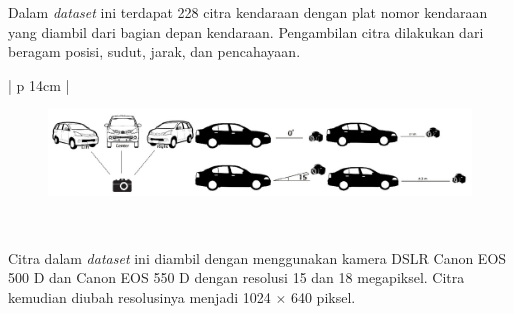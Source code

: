 \noindent Dalam \textit{dataset} ini terdapat 228 citra kendaraan dengan plat nomor kendaraan yang diambil dari bagian depan kendaraan. Pengambilan citra dilakukan dari beragam posisi, sudut, jarak, dan pencahayaan.

\begin{table}[H]
	\small
	\begin{adjustbox}{width=1\textwidth}
		\begin{tabular}{| p {14cm} |}
			\hline
			\begin{figure}[H]
				\centering
				\includegraphics[width=14cm]{images/PengambilanCitra.png}
			\end{figure} \\
			\hline
		\end{tabular}
	\end{adjustbox}
	\label{fig:IlustrasiProsesPengambilanCitraDataset}
\end{table}

\noindent Citra dalam \textit{dataset} ini diambil dengan menggunakan kamera DSLR Canon EOS 500 D dan Canon EOS 550 D dengan resolusi 15 dan 18 megapiksel. Citra kemudian diubah resolusinya menjadi 1024 $\times$ 640 piksel.


